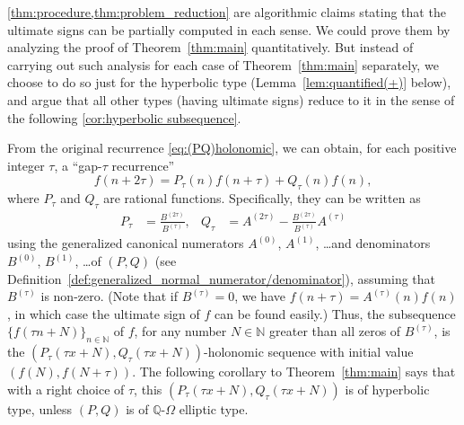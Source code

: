 \documentclass[a4paper,UKenglish,cleveref,autoref,thm-restate]{lipics-v2021}
\newcommand{\N}{\mathbb{N}}
\newcommand{\Q}{\mathbb{Q}}
\begin{document}
\cref{thm:procedure,thm:problem_reduction} are algorithmic claims stating that
the ultimate signs can be partially computed in each sense. 
We could prove them by analyzing the proof of Theorem~\ref{thm:main} quantitatively. 
But instead of carrying out such analysis for each case of Theorem~\ref{thm:main} separately, 
we choose to do so just for the hyperbolic type (Lemma~\ref{lem:quantified(+)} below),
and argue that all other types (having ultimate signs) reduce to it
in the sense of the following \cref{cor:hyperbolic subsequence}.

From the original recurrence \eqref{eq:(PQ)holonomic}, 
we can obtain, for each positive integer $\tau$, a ``gap-$\tau$ recurrence'' 
\begin{equation} \label{eq:f2tau=Pftau+Qf}
f(n+2\tau) = P_{\tau}(n) f(n+\tau) + Q_{\tau}(n) f(n), 
\end{equation}
where $P _\tau$ and $Q _\tau$ are rational functions.
Specifically, they can be written as
\begin{align} \label{eq:Ptau_and_Qtau}
P_{\tau} & = \frac{B^{(2\tau)}}{B^{(\tau)}}, 
&
Q_{\tau} & = A^{(2\tau)} - \frac{B^{(2\tau)}}{B^{(\tau)}} A^{(\tau)}
\end{align}
using the generalized canonical numerators $A ^{(0)}$, $A ^{(1)}$, \ldots and denominators $B ^{(0)}$, $B ^{(1)}$, \ldots of $(P, Q)$
(see Definition~\ref{def:generalized_normal_numerator/denominator}),
assuming that $B ^{(\tau)}$ is non-zero. 
(Note that if $B ^{(\tau)} = 0$, we have $f (n + \tau) = A ^{(\tau)} (n) f (n)$,
in which case the ultimate sign of $f$ can be found easily.)
Thus,
the subsequence $\{ f(\tau n + N ) \}_{n \in \N}$ of $f$, 
for any number $N \in \N$ greater than all zeros of $B ^{(\tau)}$, 
is the $(P_{\tau}(\tau x + N), Q_{\tau}(\tau x + N))$-holonomic sequence 
with initial value $(f(N), f(N + \tau)) $.
The following corollary to Theorem~\ref{thm:main} says that
with a right choice of $\tau$,
this $(P_{\tau}(\tau x + N), Q_{\tau}(\tau x + N))$ is of hyperbolic type, 
unless $(P, Q)$ is of $\Q$-$\Omega$ elliptic type. 
\end{document}
